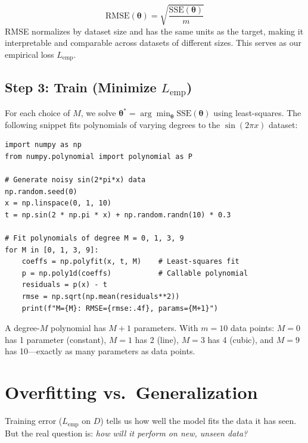 \begin{definition}
$$\text{RMSE}(\boldsymbol{\theta}) = \sqrt{\frac{\text{SSE}(\boldsymbol{\theta})}{m}}$$
RMSE normalizes by dataset size and has the same units as the target, making it interpretable and comparable across datasets of different sizes. This serves as our empirical loss $L_{\text{emp}}$.
\end{definition}

\subsection*{Step 3: Train (Minimize $L_{\text{emp}}$)}

For each choice of $M$, we solve $\boldsymbol{\theta}^* = \arg\min_{\boldsymbol{\theta}} \text{SSE}(\boldsymbol{\theta})$ using least-squares. The following snippet fits polynomials of varying degrees to the $\sin(2\pi x)$ dataset:

\begin{lstlisting}[style=pythonstyle]
import numpy as np
from numpy.polynomial import polynomial as P

# Generate noisy sin(2*pi*x) data
np.random.seed(0)
x = np.linspace(0, 1, 10)
t = np.sin(2 * np.pi * x) + np.random.randn(10) * 0.3

# Fit polynomials of degree M = 0, 1, 3, 9
for M in [0, 1, 3, 9]:
    coeffs = np.polyfit(x, t, M)    # Least-squares fit
    p = np.poly1d(coeffs)           # Callable polynomial
    residuals = p(x) - t
    rmse = np.sqrt(np.mean(residuals**2))
    print(f"M={M}: RMSE={rmse:.4f}, params={M+1}")
\end{lstlisting}

\begin{remark}
A degree-$M$ polynomial has $M+1$ parameters. With $m = 10$ data points: $M = 0$ has 1 parameter (constant), $M = 1$ has 2 (line), $M = 3$ has 4 (cubic), and $M = 9$ has 10---exactly as many parameters as data points.
\end{remark}

\section*{Overfitting vs.\ Generalization}

Training error ($L_{\text{emp}}$ on $D$) tells us how well the model fits the data it has seen. But the real question is: \textit{how will it perform on new, unseen data?}

